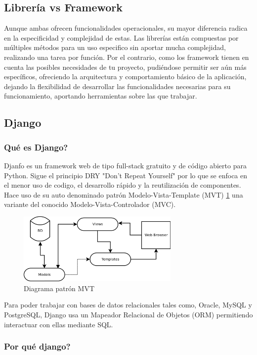 \newpage

\subsection{Librería vs Framework}
Aunque ambas ofrecen funcionalidades operacionales, su mayor diferencia radica en la especificidad y complejidad de estas.
\newline
\newline
Las librerías están compuestas por múltiples métodos para un uso especifico sin aportar mucha complejidad, realizando una tarea por función.
\newline
\newline
Por el contrario, como los framework tienen en cuenta las posibles necesidades de tu proyecto, pudiéndose permitir ser aún más específicos, ofreciendo la arquitectura y comportamiento básico de la aplicación, dejando la flexibilidad de desarrollar las funcionalidades necesarias para su funcionamiento, aportando herramientas sobre las que trabajar.

\subsection{Django}

\subsubsection{Qué es Django?}
Djanfo es un framework web de tipo full-stack gratuito y de código abierto para Python. Sigue el principio DRY "Don’t Repeat Yourself" por lo que se enfoca en el menor uso de codigo, el desarrollo rápido y la reutilización de componentes.
\newline
\newline
Hace uso de su auto denominado patrón Modelo-Vista-Template (MVT) \ref{fig:ej1} una variante del conocido Modelo-Vista-Controlador (MVC).
\newline
\begin{figure} [h!]
	\centering
	\includegraphics[width=0.7\textwidth]{fig/DjangoMTV.png}
	\caption[Diagrama patrón MVT]{Diagrama patrón MVT}
	\label{fig:ej1}
\end{figure}
\newline
Para poder trabajar con bases de datos relacionales tales como, Oracle, MySQL y PostgreSQL, Django usa un Mapeador Relacional de Objetos (ORM) permitiendo interactuar con ellas mediante SQL.
\newpage

\subsubsection{Por qué django?}
